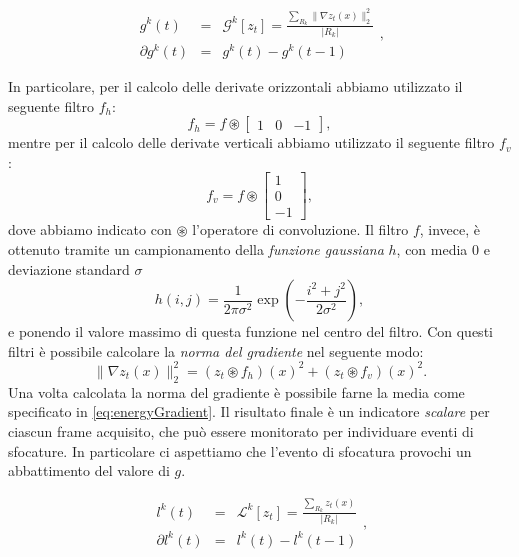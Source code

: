 \documentclass{llncs}
\begin{document}
\begin{equation}
\label{eq:gradientRegions}
\begin{array}{ccc}
g^k(t)&  = & \mathcal{G}^k[z_t] = \frac{\sum_{R_k}\| \nabla z_t(x) \| _2^2 }{|{R_k}|}\\
\partial g^k(t) & =& g^k(t)-g^k(t-1) 
\end{array},
\end{equation}

In particolare, per il calcolo delle derivate orizzontali  abbiamo utilizzato il seguente filtro $f_h$:
\[f_h = f \circledast \left[ \begin{array}{rcl}
1 & 0 & -1
\end{array}\right], \] 
mentre per il calcolo delle derivate verticali abbiamo utilizzato il seguente filtro $f_v$:
\[f_v = f \circledast \left[ \begin{array}{r}
1 \\ 0 \\ -1
\end{array}\right], \]
dove abbiamo indicato con $\circledast$ l'operatore di convoluzione.
Il filtro $f$, invece, \`e ottenuto tramite un campionamento della \textit{funzione gaussiana} $h$, con media $0$ e deviazione standard $\sigma$
\begin{equation}
\label{eq:gaussian}
h(i,j)=\frac{1}{2\pi\sigma^2}\exp\left(-\frac{i^2+j^2}{2\sigma^2}\right),
\end{equation}
e ponendo il valore massimo di questa funzione nel centro del filtro.
Con questi filtri \`e possibile calcolare la \textit{norma del gradiente} nel seguente modo:
\begin{equation}
\label{eq:normaGradiente}
\| \nabla z_t(x) \|_2^2=\left(z_t \circledast f_h\right)(x)^2 + \left(z_t \circledast f_v\right)(x)^2.
\end{equation}
Una volta calcolata la norma del gradiente \`e possibile farne la media come specificato in \eqref{eq:energyGradient}.
Il risultato finale \`e un indicatore \textit{scalare} per ciascun frame acquisito, che pu\`o essere monitorato per individuare eventi di sfocature. 
In particolare ci aspettiamo che l'evento di sfocatura provochi un abbattimento del valore di $g$.



\begin{equation}
\label{eq:lumaRegions}
\begin{array}{ccc}
l^k(t)&  = & \mathcal{L}^k[z_t] = \frac{\sum_{R_k} z_t(x) }{|{R_k}|}\\
\partial l^k(t) & =& l^k(t)-l^k(t-1) 
\end{array},
\end{equation}
\end{document}
